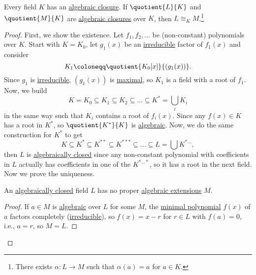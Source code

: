 \begin{theorem}\label{thm:algebraic-closures-isomorphism}
	Every field \(K\) has an \hyperref[def:algebraic-closure]{algebraic closure}. If \(\quotient{L}{K} \) and \(\quotient{M}{K} \) are \hyperref[def:algebraic-closure]{algebraic closures} over \(K\), then \(L \cong _{K} M\).\footnote{There exists \(\alpha \colon L \to M\) such that \(\alpha (a) = a\) for \(a\in K\).}
\end{theorem}
\begin{proof}
	First, we show the existence. Let \(f_1, f_2, \dots \) be (non-constant) polynomials over \(K\). Start with \(K = K_0\), let \(g_1(x)\) be an \hyperref[prev:irreducible]{irreducible} factor of \(f_1(x)\) and consider
	\[
		K_1 \coloneqq \quotient{K_0[x]}{(g_1(x))}.
	\]
	Since \(g_1\) is \hyperref[prev:irreducible]{irreducible}, \((g_1(x))\) is \hyperref[def:proper-ideal-maximal]{maximal}, so \(K_1\) is a field with a root of \(f_1\). Now, we build
	\[
		K = K_0 \subseteq K_1 \subseteq K_2 \subseteq \dots \subseteq K^{\ast} = \bigcup_{i} K_i
	\]
	in the same way such that \(K_i\) contains a root of \(f_i(x)\). Since any \(f(x)\in K\) has a root in \(K^{\ast} \), so \(\quotient{K^{\ast} }{K} \) is \hyperref[def:algebraic-extension]{algebraic}.
	Now, we do the same construction for \(K^{\ast} \) to get
	\[
		K\subseteq K^{\ast} \subseteq K^{\ast\ast } \subseteq K^{\ast\ast \ast } \subseteq \dots \subseteq L = \bigcup K^{\ast \dots },
	\]
	then \(L\) is \hyperref[def:algebraically-closed]{algebraically closed} since any non-constant polynomial with coefficients in \(L\) actually has coefficients in one of the \(K^{\ast\dots \ast} \), so it has a root in the next field. Now we prove the uniqueness.

	\begin{lemma}\label{lma:lec11-1}
		An \hyperref[def:algebraically-closed]{algebraically closed} field \(L\) has no proper \hyperref[def:algebraic-extension]{algebraic extensions} \(M\).
	\end{lemma}
	\begin{proof}
		If \(a\in M\) is \hyperref[def:algebraic]{algebraic} over \(L\) for some \(M\), the \hyperref[def:minimal-polynomial]{minimal polynomial} \(f(x)\) of \(a\) factors completely (\hyperref[prev:irreducible]{irreducible}), so \(f(x) = x-r\) for \(r\in L\) with \(f(a) = 0\), i.e., \(a = r\), so \(M = L\).
	\end{proof}


\end{proof}
